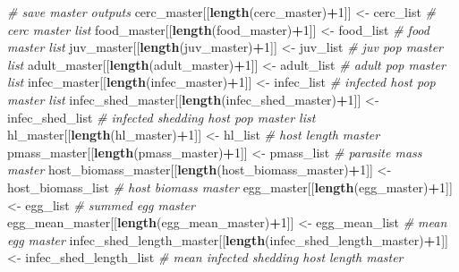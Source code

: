 \documentclass[10,portrait]{article}
\newenvironment{Shaded}{\begin{snugshade}}{\end{snugshade}}
\newcommand{\KeywordTok}[1]{\textcolor[rgb]{0.13,0.29,0.53}{\textbf{#1}}}
\newcommand{\DecValTok}[1]{\textcolor[rgb]{0.00,0.00,0.81}{#1}}
\newcommand{\StringTok}[1]{\textcolor[rgb]{0.31,0.60,0.02}{#1}}
\newcommand{\CommentTok}[1]{\textcolor[rgb]{0.56,0.35,0.01}{\textit{#1}}}
\newcommand{\OperatorTok}[1]{\textcolor[rgb]{0.81,0.36,0.00}{\textbf{#1}}}
\newcommand{\NormalTok}[1]{#1}
\begin{document}
\begin{Shaded}
\begin{Highlighting}[]
{{{{{{{{{{{{                    \CommentTok{# save master outputs }
\NormalTok{                    cerc_master[[}\KeywordTok{length}\NormalTok{(cerc_master)}\OperatorTok{+}\DecValTok{1}\NormalTok{]] <-}\StringTok{ }\NormalTok{cerc_list }\CommentTok{# cerc master list}
\NormalTok{                    food_master[[}\KeywordTok{length}\NormalTok{(food_master)}\OperatorTok{+}\DecValTok{1}\NormalTok{]] <-}\StringTok{ }\NormalTok{food_list }\CommentTok{# food master list}
\NormalTok{                    juv_master[[}\KeywordTok{length}\NormalTok{(juv_master)}\OperatorTok{+}\DecValTok{1}\NormalTok{]] <-}\StringTok{ }\NormalTok{juv_list }\CommentTok{# juv pop master list}
\NormalTok{                    adult_master[[}\KeywordTok{length}\NormalTok{(adult_master)}\OperatorTok{+}\DecValTok{1}\NormalTok{]] <-}\StringTok{ }\NormalTok{adult_list }\CommentTok{# adult pop master list}
\NormalTok{                    infec_master[[}\KeywordTok{length}\NormalTok{(infec_master)}\OperatorTok{+}\DecValTok{1}\NormalTok{]] <-}\StringTok{ }\NormalTok{infec_list }\CommentTok{# infected host pop master list}
\NormalTok{                    infec_shed_master[[}\KeywordTok{length}\NormalTok{(infec_shed_master)}\OperatorTok{+}\DecValTok{1}\NormalTok{]] <-}\StringTok{ }\NormalTok{infec_shed_list }\CommentTok{# infected shedding host pop master list}
\NormalTok{                    hl_master[[}\KeywordTok{length}\NormalTok{(hl_master)}\OperatorTok{+}\DecValTok{1}\NormalTok{]] <-}\StringTok{ }\NormalTok{hl_list }\CommentTok{# host length master}
\NormalTok{                    pmass_master[[}\KeywordTok{length}\NormalTok{(pmass_master)}\OperatorTok{+}\DecValTok{1}\NormalTok{]] <-}\StringTok{ }\NormalTok{pmass_list }\CommentTok{# parasite mass master}
\NormalTok{                    host_biomass_master[[}\KeywordTok{length}\NormalTok{(host_biomass_master)}\OperatorTok{+}\DecValTok{1}\NormalTok{]] <-}\StringTok{ }\NormalTok{host_biomass_list }\CommentTok{# host biomass master}
\NormalTok{                    egg_master[[}\KeywordTok{length}\NormalTok{(egg_master)}\OperatorTok{+}\DecValTok{1}\NormalTok{]] <-}\StringTok{ }\NormalTok{egg_list }\CommentTok{# summed egg master}
\NormalTok{                    egg_mean_master[[}\KeywordTok{length}\NormalTok{(egg_mean_master)}\OperatorTok{+}\DecValTok{1}\NormalTok{]] <-}\StringTok{ }\NormalTok{egg_mean_list }\CommentTok{# mean egg master}
\NormalTok{                    infec_shed_length_master[[}\KeywordTok{length}\NormalTok{(infec_shed_length_master)}\OperatorTok{+}\DecValTok{1}\NormalTok{]] <-}\StringTok{ }\NormalTok{infec_shed_length_list }\CommentTok{# mean infected shedding host length master}
                    
}}}}}}}}}}}}
\end{Highlighting}
\end{Shaded}
\end{document}

